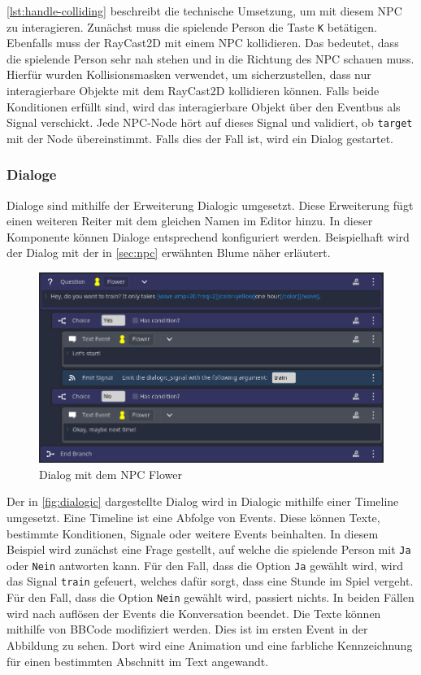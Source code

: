 \autoref{lst:handle-colliding} beschreibt die technische Umsetzung, um mit diesem \ac{NPC} zu interagieren.
Zunächst muss die spielende Person die Taste \texttt{K} betätigen.
Ebenfalls muss der RayCast2D mit einem \ac{NPC} kollidieren.
Das bedeutet, dass die spielende Person sehr nah stehen und in die Richtung des \ac{NPC} schauen muss.
Hierfür wurden Kollisionsmasken verwendet, um sicherzustellen, dass nur interagierbare Objekte mit dem RayCast2D kollidieren können.
Falls beide Konditionen erfüllt sind, wird das interagierbare Objekt über den Eventbus als Signal verschickt.
Jede \ac{NPC}-Node hört auf dieses Signal und validiert, ob \texttt{target} mit der Node übereinstimmt.
Falls dies der Fall ist, wird ein Dialog gestartet.

\subsubsection{Dialoge}
Dialoge sind mithilfe der Erweiterung Dialogic umgesetzt\cite{github-dialogic}.
Diese Erweiterung fügt einen weiteren Reiter mit dem gleichen Namen im Editor hinzu.
In dieser Komponente können Dialoge entsprechend konfiguriert werden.
Beispielhaft wird der Dialog mit der in \autoref{sec:npc} erwähnten Blume näher erläutert.\\

\begin{figure}[H]
    \centering
    \includegraphics[width=0.9\columnwidth]{figures/screenshots/dialogic.png}
    \caption{\label{fig:dialogic}Dialog mit dem \ac{NPC} Flower}
\end{figure}

Der in \autoref{fig:dialogic} dargestellte Dialog wird in Dialogic mithilfe einer Timeline umgesetzt.
Eine Timeline ist eine Abfolge von Events. Diese können Texte, bestimmte Konditionen, Signale oder weitere Events beinhalten.
In diesem Beispiel wird zunächst eine Frage gestellt, auf welche die spielende Person mit \texttt{Ja} oder \texttt{Nein} antworten kann.
Für den Fall, dass die Option \texttt{Ja} gewählt wird, wird das Signal \texttt{train} gefeuert, welches dafür sorgt, dass eine Stunde im Spiel vergeht.
Für den Fall, dass die Option \texttt{Nein} gewählt wird, passiert nichts.
In beiden Fällen wird nach auflösen der Events die Konversation beendet.
Die Texte können mithilfe von BBCode modifiziert werden.
Dies ist im ersten Event in der Abbildung zu sehen.
Dort wird eine Animation und eine farbliche Kennzeichnung für einen bestimmten Abschnitt im Text angewandt.

